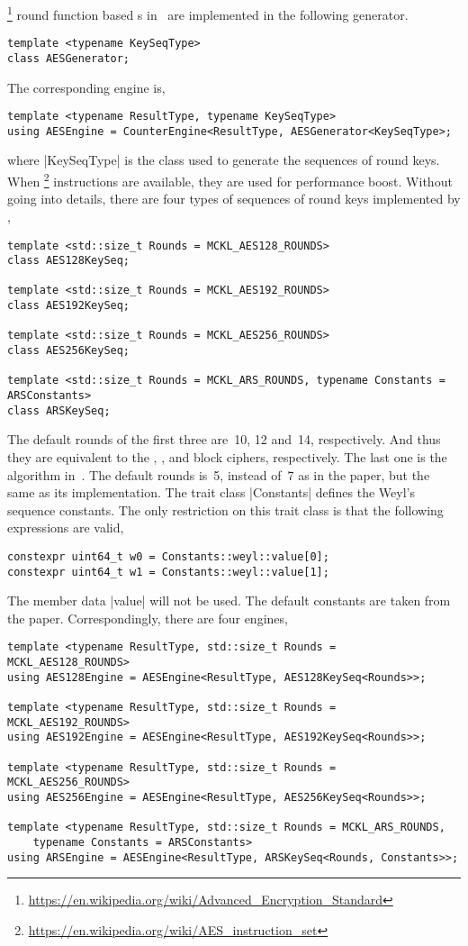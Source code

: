 \aes\footnote{\url{https://en.wikipedia.org/wiki/Advanced_Encryption_Standard}}
round function based \rng{}s in~\cite{Salmon:2011um} are implemented in the
following generator.
\begin{verbatim}
template <typename KeySeqType>
class AESGenerator;
\end{verbatim}
The corresponding \rng engine is,
\begin{verbatim}
template <typename ResultType, typename KeySeqType>
using AESEngine = CounterEngine<ResultType, AESGenerator<KeySeqType>;
\end{verbatim}
where |KeySeqType| is the class used to generate the sequences of round keys.
When \aesni\footnote{\url{https://en.wikipedia.org/wiki/AES_instruction_set}}
instructions are available, they are used for performance boost. Without going
into details, there are four types of sequences of round keys implemented by
\mckl,
\begin{verbatim}
template <std::size_t Rounds = MCKL_AES128_ROUNDS>
class AES128KeySeq;

template <std::size_t Rounds = MCKL_AES192_ROUNDS>
class AES192KeySeq;

template <std::size_t Rounds = MCKL_AES256_ROUNDS>
class AES256KeySeq;

template <std::size_t Rounds = MCKL_ARS_ROUNDS, typename Constants = ARSConstants>
class ARSKeySeq;
\end{verbatim}
The default rounds of the first three are~10, 12 and~14, respectively. And thus
they are equivalent to the , , and  block ciphers,
respectively. The last one is the \ars algorithm in~\cite{Salmon:2011um}. The
default rounds is~5, instead of~7 as in the paper, but the same as its \mkl
implementation. The trait class |Constants| defines the Weyl's sequence
constants. The only restriction on this trait class is that the following
expressions are valid,
\begin{verbatim}
constexpr uint64_t w0 = Constants::weyl::value[0];
constexpr uint64_t w1 = Constants::weyl::value[1];
\end{verbatim}
The member data |value| will not be \odr used. The default constants are taken
from the paper. Correspondingly, there are four \rng engines,
\begin{verbatim}
template <typename ResultType, std::size_t Rounds = MCKL_AES128_ROUNDS>
using AES128Engine = AESEngine<ResultType, AES128KeySeq<Rounds>>;

template <typename ResultType, std::size_t Rounds = MCKL_AES192_ROUNDS>
using AES192Engine = AESEngine<ResultType, AES192KeySeq<Rounds>>;

template <typename ResultType, std::size_t Rounds = MCKL_AES256_ROUNDS>
using AES256Engine = AESEngine<ResultType, AES256KeySeq<Rounds>>;

template <typename ResultType, std::size_t Rounds = MCKL_ARS_ROUNDS,
    typename Constants = ARSConstants>
using ARSEngine = AESEngine<ResultType, ARSKeySeq<Rounds, Constants>>;
\end{verbatim}
